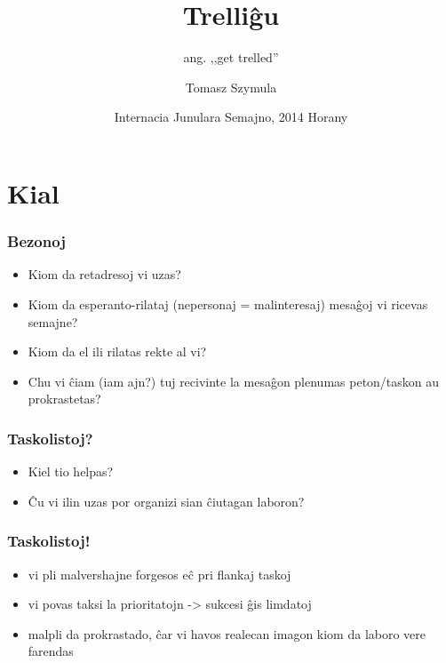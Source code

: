 \documentclass{beamer}
\title{Trelliĝu}
\subtitle{ang. ,,get trelled''}
\author{Tomasz Szymula}
\institute[PEJ]{Pola Esperanto-Junularo}
\date[IJS 2014]{Internacia Junulara Semajno, 2014 Horany}
\begin{document}
  \frame{\titlepage}


  
  \section{Kial}
   
  \begin{frame}
    \frametitle{Bezonoj}
    
    \begin{itemize}
    	\item Kiom da retadresoj vi uzas?
    	\item Kiom da esperanto-rilataj (nepersonaj = malinteresaj) mesaĝoj vi ricevas semajne?
    	\item Kiom da el ili rilatas rekte al vi?
    	\item Chu vi ĉiam (iam ajn?) tuj recivinte la mesaĝon plenumas peton/taskon au prokrastetas?
    \end{itemize}
  \end{frame}
   
   
   
  \begin{frame}
    \frametitle{Taskolistoj?}
    
    \begin{itemize}
    	\item Kiel tio helpas?
    	\item Ĉu vi ilin uzas por organizi sian ĉiutagan laboron?
    \end{itemize}
  \end{frame}    


   
  \begin{frame}
    \frametitle{Taskolistoj!}
    \begin{itemize}

    	\item vi pli malvershajne forgesos eĉ pri flankaj taskoj
    	\item vi povas taksi la prioritatojn -> sukcesi ĝis limdatoj
      \item malpli da prokrastado, ĉar vi havos realecan imagon kiom da laboro vere farendas
      
    \end{itemize}
  \end{frame}      
\end{document}
